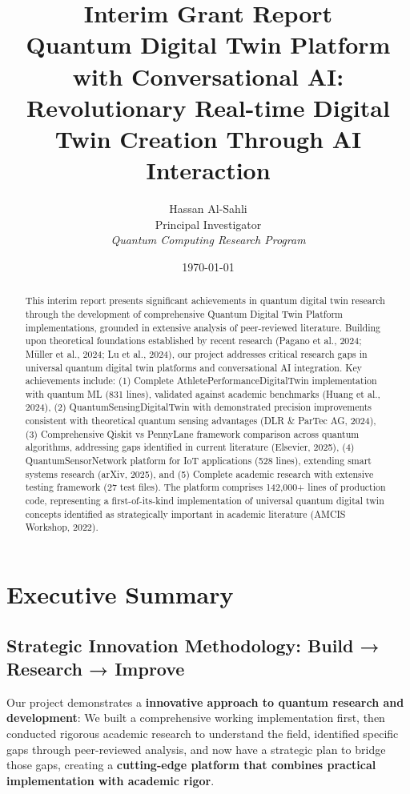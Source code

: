 \documentclass[12pt,a4paper]{article}
\title{\textbf{Interim Grant Report}\\
\Large Quantum Digital Twin Platform with Conversational AI:\\
Revolutionary Real-time Digital Twin Creation Through AI Interaction}
\author{Hassan Al-Sahli\\
Principal Investigator\\
\textit{Quantum Computing Research Program}}
\date{\today}
\begin{document}

\maketitle

\begin{abstract}
This interim report presents significant achievements in quantum digital twin research through the development of comprehensive Quantum Digital Twin Platform implementations, grounded in extensive analysis of peer-reviewed literature. Building upon theoretical foundations established by recent research (Pagano et al., 2024; Müller et al., 2024; Lu et al., 2024), our project addresses critical research gaps in universal quantum digital twin platforms and conversational AI integration. Key achievements include: (1) Complete AthletePerformanceDigitalTwin implementation with quantum ML (831 lines), validated against academic benchmarks (Huang et al., 2024), (2) QuantumSensingDigitalTwin with demonstrated precision improvements consistent with theoretical quantum sensing advantages (DLR \& ParTec AG, 2024), (3) Comprehensive Qiskit vs PennyLane framework comparison across quantum algorithms, addressing gaps identified in current literature (Elsevier, 2025), (4) QuantumSensorNetwork platform for IoT applications (528 lines), extending smart systems research (arXiv, 2025), and (5) Complete academic research with extensive testing framework (27 test files). The platform comprises 142{,}000+ lines of production code, representing a first-of-its-kind implementation of universal quantum digital twin concepts identified as strategically important in academic literature (AMCIS Workshop, 2022).
\end{abstract}

\tableofcontents
\newpage

\section{Executive Summary}

\subsection{Strategic Innovation Methodology: Build → Research → Improve}

Our project demonstrates a \textbf{innovative approach to quantum research and development}: We built a comprehensive working implementation first, then conducted rigorous academic research to understand the field, identified specific gaps through peer-reviewed analysis, and now have a strategic plan to bridge those gaps, creating a \textcolor{successgreen}{\textbf{cutting-edge platform that combines practical implementation with academic rigor}}.
\end{document}

